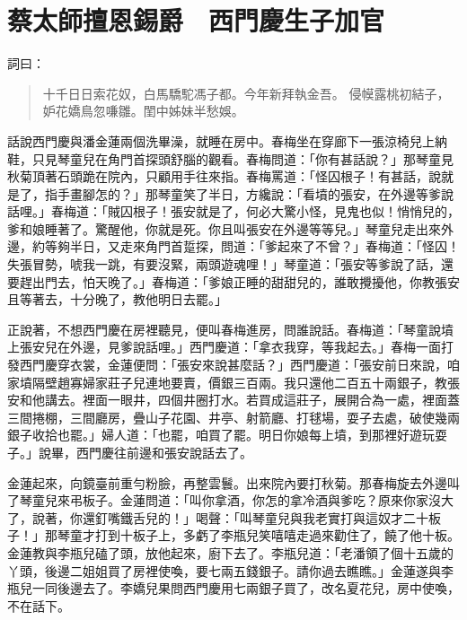 
\chapter{蔡太師擅恩錫爵　西門慶生子加官}

詞曰：
\begin{quote}
十千日日索花奴，白馬驕駝馮子都。今年新拜執金吾。
侵幙露桃初結子，妒花嬌鳥忽嗛雛。閨中姊妹半愁娛。
\end{quote}

話說西門慶與潘金蓮兩個洗畢澡，就睡在房中。春梅坐在穿廊下一張涼椅兒上納鞋，只見琴童兒在角門首探頭舒腦的觀看。春梅問道：「你有甚話說？」那琴童見秋菊頂著石頭跪在院內，只顧用手往來指。春梅罵道：「怪囚根子！有甚話，說就是了，指手畫腳怎的？」那琴童笑了半日，方纔說：「看墳的張安，在外邊等爹說話哩。」春梅道：「賊囚根子！張安就是了，何必大驚小怪，見鬼也似！悄悄兒的，爹和娘睡著了。驚醒他，你就是死。你且叫張安在外邊等等兒。」琴童兒走出來外邊，約等夠半日，又走來角門首踅探，問道：「爹起來了不曾？」春梅道：「怪囚！失張冒勢，唬我一跳，有要沒緊，兩頭遊魂哩！」琴童道：「張安等爹說了話，還要趕出門去，怕天晚了。」春梅道：「爹娘正睡的甜甜兒的，誰敢攪擾他，你教張安且等著去，十分晚了，教他明日去罷。」

正說著，不想西門慶在房裡聽見，便叫春梅進房，問誰說話。春梅道：「琴童說墳上張安兒在外邊，見爹說話哩。」西門慶道：「拿衣我穿，等我起去。」春梅一面打發西門慶穿衣裳，金蓮便問：「張安來說甚麼話？」西門慶道：「張安前日來說，咱家墳隔壁趙寡婦家莊子兒連地要賣，價銀三百兩。我只還他二百五十兩銀子，教張安和他講去。裡面一眼井，四個井圈打水。若買成這莊子，展開合為一處，裡面蓋三間捲棚，三間廳房，疊山子花園、井亭、射箭廳、打毬場，耍子去處，破使幾兩銀子收拾也罷。」婦人道：「也罷，咱買了罷。明日你娘每上墳，到那裡好遊玩耍子。」說畢，西門慶往前邊和張安說話去了。

金蓮起來，向鏡臺前重勻粉臉，再整雲鬟。出來院內要打秋菊。那春梅旋去外邊叫了琴童兒來弔板子。金蓮問道：「叫你拿酒，你怎的拿冷酒與爹吃？原來你家沒大了，說著，你還釘嘴鐵舌兒的！」喝聲：「叫琴童兒與我老實打與這奴才二十板子！」那琴童才打到十板子上，多虧了李瓶兒笑嘻嘻走過來勸住了，饒了他十板。金蓮教與李瓶兒磕了頭，放他起來，廚下去了。李瓶兒道：「老潘領了個十五歲的丫頭，後邊二姐姐買了房裡使喚，要七兩五錢銀子。請你過去瞧瞧。」金蓮遂與李瓶兒一同後邊去了。李嬌兒果問西門慶用七兩銀子買了，改名夏花兒，房中使喚，不在話下。

